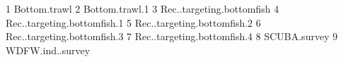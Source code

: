 \begin{Schunk}
\begin{Soutput}
1 Bottom.trawl 
2 Bottom.trawl.1 
3 Rec..targeting.bottomfish 
4 Rec..targeting.bottomfish.1 
5 Rec..targeting.bottomfish.2 
6 Rec..targeting.bottomfish.3 
7 Rec..targeting.bottomfish.4 
8 SCUBA.survey 
9 WDFW.ind..survey 
\end{Soutput}
\end{Schunk}
